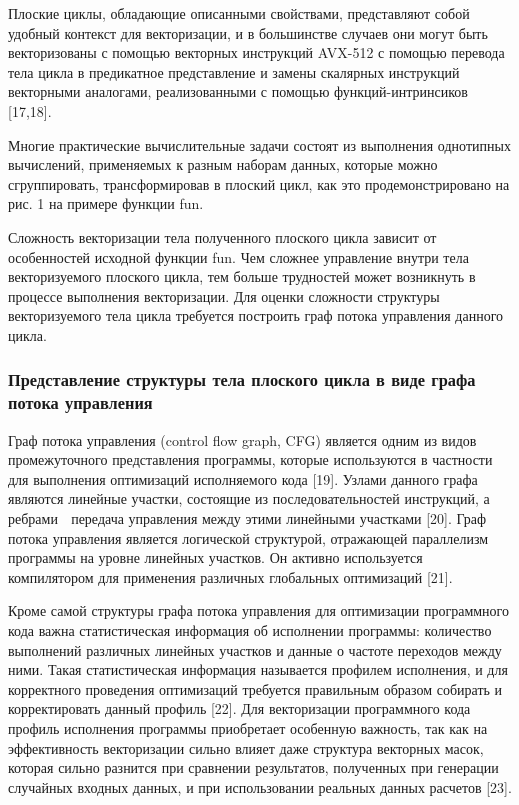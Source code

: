 Плоские циклы, обладающие описанными свойствами, представляют собой удобный контекст для векторизации, и в большинстве случаев они могут быть векторизованы с помощью векторных инструкций AVX-512 с помощью перевода тела цикла в предикатное представление и замены скалярных инструкций векторными аналогами, реализованными с помощью функций-интринсиков [17,18].

Многие практические вычислительные задачи состоят из выполнения однотипных вычислений, применяемых к разным наборам данных, которые можно сгруппировать, трансформировав в плоский цикл, как это продемонстрировано на рис. 1 на примере функции fun.

Сложность векторизации тела полученного плоского цикла зависит от особенностей исходной функции fun.
Чем сложнее управление 
внутри тела векторизуемого плоского цикла, тем больше трудностей может возникнуть в процессе выполнения векторизации.
Для оценки сложности структуры векторизуемого тела цикла требуется построить граф потока управления данного цикла.

\subsubsection{Представление структуры тела плоского цикла в виде графа потока управления}

Граф потока управления (control flow graph, CFG) является одним из видов промежуточного представления программы, которые используются в частности для выполнения оптимизаций исполняемого кода [19].
Узлами данного графа являются линейные участки, состоящие из последовательностей инструкций, а ребрами  передача управления между этими линейными участками [20].
Граф потока управления является логической структурой, отражающей параллелизм программы на уровне линейных участков.
Он активно используется компилятором для применения различных глобальных оптимизаций [21].

Кроме самой структуры графа потока управления для оптимизации программного кода важна статистическая информация об исполнении программы: количество выполнений различных линейных участков и данные о частоте переходов между ними.
Такая статистическая информация называется профилем исполнения, и для корректного проведения оптимизаций требуется правильным образом собирать и корректировать данный профиль [22].
Для векторизации программного кода профиль исполнения программы приобретает особенную важность, так как на эффективность векторизации сильно влияет даже структура векторных масок, которая сильно разнится при сравнении результатов, полученных при генерации случайных входных данных, и при использовании реальных данных расчетов [23].

